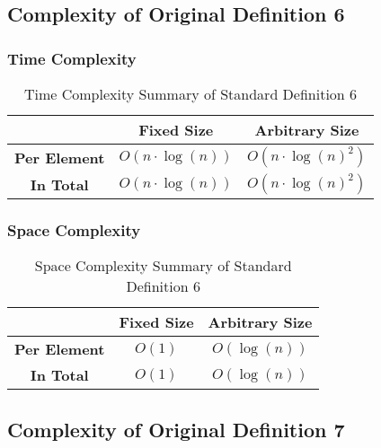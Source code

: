 \documentclass[conference]{IEEEtran}
\begin{document}
\subsection{Complexity of Original Definition 6}
\label{ca:p2_d06}

\subsubsection{Time Complexity}


\renewcommand{\arraystretch}{1.25}
\begin{table}[H]
    \centering
    \caption{Time Complexity Summary of Standard Definition 6}
    \begin{tabular}{|c|c|c|}
        \hline
        & \textbf{Fixed Size} & \textbf{Arbitrary Size} \\
        \hline
        \textbf{Per Element} & $O(n \cdot \log(n))$ & $O\left(n \cdot \log(n)^2\right)$ \\
        \hline
        \textbf{In Total} & $O(n \cdot \log(n))$ & $O\left(n \cdot \log(n)^2\right)$ \\
        \hline
    \end{tabular}
    \label{tab:time_p2_d06}
\end{table}
\renewcommand{\arraystretch}{1}

\subsubsection{Space Complexity}

\begin{table}[H]
    \centering
    \caption{Space Complexity Summary of Standard Definition 6}
    \begin{tabular}{|c|c|c|}
        \hline
        & \textbf{Fixed Size} & \textbf{Arbitrary Size} \\
        \hline
        \textbf{Per Element} & $O(1)$ & $O(\log(n))$ \\
        \hline
        \textbf{In Total} & $O(1)$ & $O(\log(n))$ \\
        \hline
    \end{tabular}
    \label{tab:space_p2_d06}
\end{table}

\subsection{Complexity of Original Definition 7}
\label{ca:p2_d07}
\end{document}

